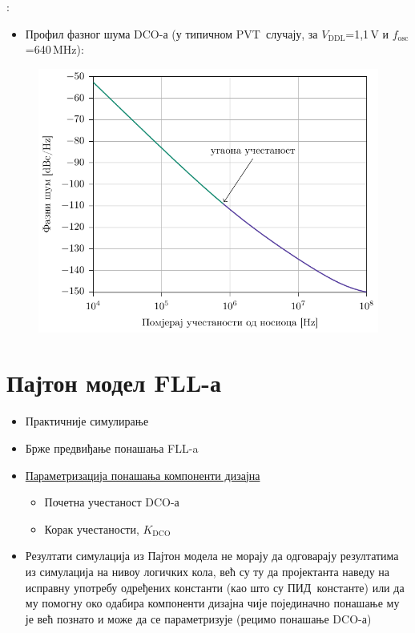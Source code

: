 \documentclass[aspectratio=169]{beamer}
\def \FLL  {FLL} %
\def \DCO  {DCO} %
\def \PID  {ПИД} %
\def \PVT  {PVT} %
\begin{document}
\begin{frame}{\secname: \subsecname}
    \begin{itemize}
        \item Профил фазног шума \DCO-а (у типичном \PVT\ случају, за $V_\text{DDL}$=1,1\,V и $f_\text{osc}$=640\,MHz):
    \end{itemize}
    \begin{figure}[!t]
	    \centering
	    \includegraphics[scale=0.65]{slike/prezentacija/sim_DCO_phase_noise.pdf}
	    \label{DCO_phase_noise}
    \end{figure}
\end{frame}

\section{Пајтон модел \FLL-а}

\begin{frame}{\secname}
	\begin{itemize}
		\item Практичније симулирање
		\item Брже предвиђање понашања \FLL-a
		\item \underline{Параметризација понашања компоненти дизајна}
			\begin{itemize}
				\item Почетна учестаност \DCO-а
				\item Корак учестаности, $K_\text{DCO}$
			\end{itemize}
		\item Резултати симулација из Пајтон модела не морају да одговарају резултатима из симулација на нивоу логичких кола, већ су ту да пројектанта наведу на исправну употребу одређених константи (као што су \PID\ константе) или да му помогну око одабира компоненти дизајна чије појединачно понашање му је већ познато и може да се параметризује (рецимо понашање \DCO-а)
	\end{itemize}
\end{frame}
\end{document}
